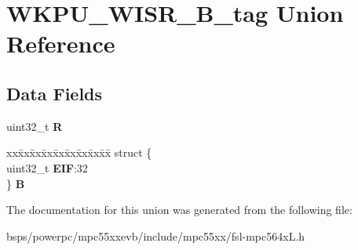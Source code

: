 \hypertarget{unionWKPU__WISR__32B__tag}{}\section{W\+K\+P\+U\+\_\+\+W\+I\+S\+R\+\_\+B\+\_\+tag Union Reference}
\label{unionWKPU__WISR__32B__tag}
\subsection*{Data Fields}
\begin{DoxyCompactItemize}
\item 
\mbox{\label{unionWKPU__WISR__32B__tag_a6497a576a7ffa963ff4e2a79e27daed9}} 
uint32\+\_\+t {\bfseries R}
\item 
\mbox{\label{unionWKPU__WISR__32B__tag_a71714b3df3fd2f8e875c3b586dc3840d}} 
\begin{tabbing}
xx\=xx\=xx\=xx\=xx\=xx\=xx\=xx\=xx\=\kill
struct \{\\
\>uint32\_t {\bfseries EIF}:32\\
\} {\bfseries B}\\

\end{tabbing}\end{DoxyCompactItemize}


The documentation for this union was generated from the following file\+:\begin{DoxyCompactItemize}
\item 
bsps/powerpc/mpc55xxevb/include/mpc55xx/fsl-\/mpc564x\+L.\+h\end{DoxyCompactItemize}
